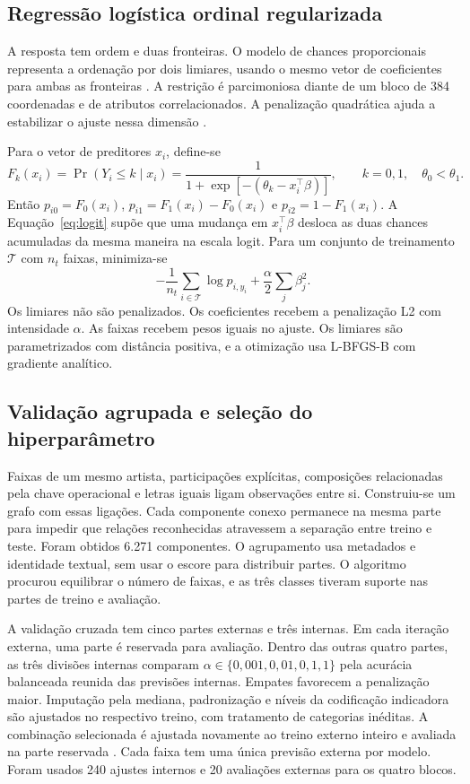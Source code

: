 \subsection{Regressão logística ordinal regularizada}
A resposta tem ordem e duas fronteiras. O modelo de chances proporcionais representa a ordenação por dois limiares, usando o mesmo vetor de coeficientes para ambas as fronteiras \cite{mccullagh1980,agresti2010}. A restrição é parcimoniosa diante de um bloco de 384 coordenadas e de atributos correlacionados. A penalização quadrática ajuda a estabilizar o ajuste nessa dimensão \cite{hoerl1970,hastie2009}.

Para o vetor de preditores $x_i$, define-se
\begin{equation}
F_k(x_i)=\Pr(Y_i\leq k\mid x_i)
=\frac{1}{1+\exp[-(\theta_k-x_i^\top\beta)]},\qquad
k=0,1,\quad \theta_0<\theta_1.
\label{eq:logit}
\end{equation}
Então $p_{i0}=F_0(x_i)$, $p_{i1}=F_1(x_i)-F_0(x_i)$ e $p_{i2}=1-F_1(x_i)$. A Equação~\ref{eq:logit} supõe que uma mudança em $x_i^\top\beta$ desloca as duas chances acumuladas da mesma maneira na escala logit. Para um conjunto de treinamento $\mathcal T$ com $n_t$ faixas, minimiza-se
\begin{equation}
-\frac{1}{n_t}\sum_{i\in\mathcal T}\log p_{i,y_i}
+\frac{\alpha}{2}\sum_j \beta_j^2.
\end{equation}
Os limiares não são penalizados. Os coeficientes recebem a penalização L2 com intensidade $\alpha$. As faixas recebem pesos iguais no ajuste. Os limiares são parametrizados com distância positiva, e a otimização usa L-BFGS-B com gradiente analítico.

\subsection{Validação agrupada e seleção do hiperparâmetro}
Faixas de um mesmo artista, participações explícitas, composições relacionadas pela chave operacional e letras iguais ligam observações entre si. Construiu-se um grafo com essas ligações. Cada componente conexo permanece na mesma parte para impedir que relações reconhecidas atravessem a separação entre treino e teste. Foram obtidos 6.271 componentes. O agrupamento usa metadados e identidade textual, sem usar o escore para distribuir partes. O algoritmo procurou equilibrar o número de faixas, e as três classes tiveram suporte nas partes de treino e avaliação.

A validação cruzada tem cinco partes externas e três internas. Em cada iteração externa, uma parte é reservada para avaliação. Dentro das outras quatro partes, as três divisões internas comparam $\alpha\in\{0{,}001,0{,}01,0{,}1,1\}$ pela acurácia balanceada reunida das previsões internas. Empates favorecem a penalização maior. Imputação pela mediana, padronização e níveis da codificação indicadora são ajustados no respectivo treino, com tratamento de categorias inéditas. A combinação selecionada é ajustada novamente ao treino externo inteiro e avaliada na parte reservada \cite{cawley2010}. Cada faixa tem uma única previsão externa por modelo. Foram usados 240 ajustes internos e 20 avaliações externas para os quatro blocos.


